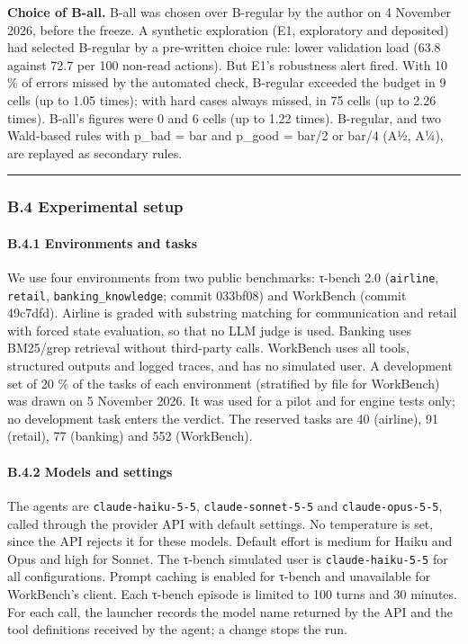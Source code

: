 \textbf{Choice of B-all.} B-all was chosen over B-regular by the author on 4 November 2026, before the freeze. A synthetic exploration (E1, exploratory and deposited) had selected B-regular by a pre-written choice rule: lower validation load (63.8 against 72.7 per 100 non-read actions). But E1's robustness alert fired. With 10 \% of errors missed by the automated check, B-regular exceeded the budget in 9 cells (up to 1.05 times); with hard cases always missed, in 75 cells (up to 2.26 times). B-all's figures were 0 and 6 cells (up to 1.22 times). B-regular, and two Wald-based rules with p\_bad = bar and p\_good = bar/2 or bar/4 (A½, A¼), are replayed as secondary rules.

\begin{center}\rule{0.5\linewidth}{0.5pt}\end{center}

\subsubsection{B.4 Experimental setup}\label{b.4-experimental-setup}

\paragraph{B.4.1 Environments and tasks}\label{b.4.1-environments-and-tasks}

We use four environments from two public benchmarks: τ-bench 2.0 (\texttt{airline}, \texttt{retail}, \texttt{banking\_\allowbreak{}knowledge}; commit 033bf08) and WorkBench (commit 49c7dfd). Airline is graded with substring matching for communication and retail with forced state evaluation, so that no LLM judge is used. Banking uses BM25/grep retrieval without third-party calls. WorkBench uses all tools, structured outputs and logged traces, and has no simulated user. A development set of 20 \% of the tasks of each environment (stratified by file for WorkBench) was drawn on 5 November 2026. It was used for a pilot and for engine tests only; no development task enters the verdict. The reserved tasks are 40 (airline), 91 (retail), 77 (banking) and 552 (WorkBench).

\paragraph{B.4.2 Models and settings}\label{b.4.2-models-and-settings}

The agents are \texttt{claude-haiku-5-5}, \texttt{claude-sonnet-5-5} and \texttt{claude-opus-5-5}, called through the provider API with default settings. No temperature is set, since the API rejects it for these models. Default effort is medium for Haiku and Opus and high for Sonnet. The τ-bench simulated user is \texttt{claude-haiku-5-5} for all configurations. Prompt caching is enabled for τ-bench and unavailable for WorkBench's client. Each τ-bench episode is limited to 100 turns and 30 minutes. For each call, the launcher records the model name returned by the API and the tool definitions received by the agent; a change stops the run.

